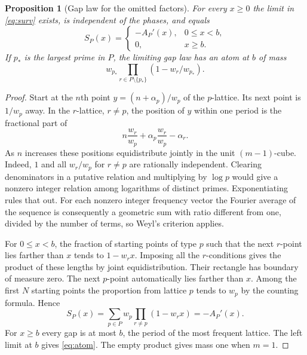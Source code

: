 \documentclass[11pt]{article}
\newtheorem{proposition}[theorem]{Proposition}
\begin{document}
\begin{proposition}[Gap law for the omitted factors]\label{prop:forward}
For every $x\ge0$ the limit in \eqref{eq:surv} exists, is independent of the
phases, and equals
\begin{equation}\label{eq:law}
 S_P(x)=
 \begin{cases}
  -A_P'(x),&0\le x<b,\\
  0,&x\ge b.
 \end{cases}
\end{equation}
If $p_*$ is the largest prime in $P$, the limiting gap law has an atom at $b$ of mass
\begin{equation}\label{eq:atom}
 w_{p_*}\prod_{r\in P\setminus\{p_*\}}(1-w_r/w_{p_*}).
\end{equation}
\end{proposition}

\begin{proof}
Start at the $n$th point $y=(n+\alpha_p)/w_p$ of the $p$-lattice.
Its next point is $1/w_p$ away. In the $r$-lattice, $r\ne p$, the position
of $y$ within one period is the fractional part of
\[
 n\frac{w_r}{w_p}+\alpha_p\frac{w_r}{w_p}-\alpha_r .
\]
As $n$ increases these positions equidistribute jointly in the unit
$(m-1)$-cube. Indeed, $1$ and all $w_r/w_p$ for $r\ne p$ are rationally
independent. Clearing denominators in a putative relation and multiplying by $\log p$ would
give a nonzero integer relation among logarithms of distinct primes.
Exponentiating rules that out. For each nonzero integer frequency vector the
Fourier average of the sequence is consequently a geometric sum with ratio
different from one, divided by the number of terms, so Weyl's criterion applies.

For $0\le x<b$, the fraction of starting points of type $p$ such that the next
$r$-point lies farther than $x$ tends to $1-w_rx$. Imposing all the $r$-conditions
gives the product of these lengths by joint equidistribution. Their rectangle
has boundary of measure zero. The next $p$-point automatically lies farther
than $x$. Among the first $N$ starting points the proportion from lattice $p$
tends to $w_p$ by the counting formula. Hence
\[
 S_P(x)=\sum_{p\in P}w_p\prod_{r\ne p}(1-w_rx)=-A_P'(x).
\]
For $x\ge b$ every gap is at most $b$, the period of the most frequent lattice.
The left limit at $b$ gives \eqref{eq:atom}. The empty product gives mass one
when $m=1$.
\end{proof}
\end{document}
